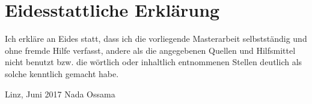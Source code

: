 \chapter*{Eidesstattliche Erkl\"arung}
\thispagestyle{empty}

Ich erkl\"are an Eides statt, dass ich die vorliegende Masterarbeit selbstst\"andig und ohne fremde Hilfe verfasst, andere als die angegebenen Quellen und Hilfsmittel nicht benutzt bzw. die w\"ortlich oder inhaltlich entnommenen Stellen deutlich als solche kenntlich gemacht habe.

Linz, Juni 2017
\hfill Nada Ossama
